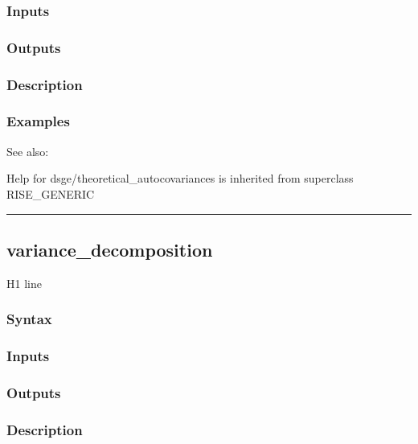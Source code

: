 \documentclass[letterpaper,10pt,english]{sphinxmanual}
\begin{document}
\subsubsection{Inputs}
\label{classes/models/@dsge/dsge:id207}

\subsubsection{Outputs}
\label{classes/models/@dsge/dsge:id208}

\subsubsection{Description}
\label{classes/models/@dsge/dsge:id209}

\subsubsection{Examples}
\label{classes/models/@dsge/dsge:id210}
See also:

Help for dsge/theoretical\_autocovariances is inherited from superclass RISE\_GENERIC


\bigskip\hrule{}\bigskip



\subsection{variance\_decomposition}
\label{classes/models/@dsge/dsge:id211}\label{classes/models/@dsge/dsge:variance-decomposition}
H1 line


\subsubsection{Syntax}
\label{classes/models/@dsge/dsge:id212}

\subsubsection{Inputs}
\label{classes/models/@dsge/dsge:id213}

\subsubsection{Outputs}
\label{classes/models/@dsge/dsge:id214}

\subsubsection{Description}
\label{classes/models/@dsge/dsge:id215}
\end{document}
